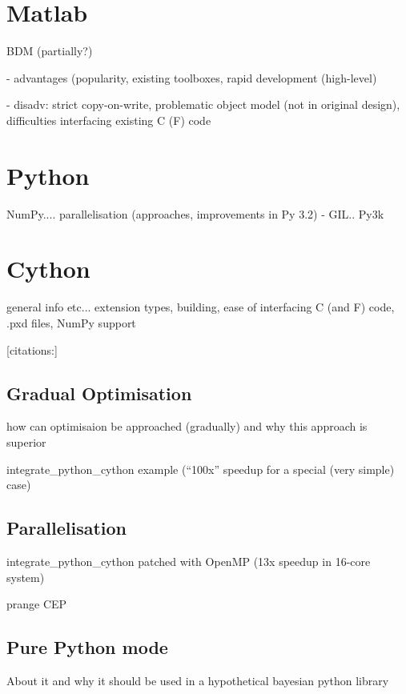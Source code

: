 \documentclass[a4paper,12pt,oneside]{report}
\begin{document}
\section{Matlab}

BDM (partially?)

 - advantages (popularity, existing toolboxes, rapid development (high-level)

 - disadv: strict copy-on-write, problematic object model (not in original design), difficulties
           interfacing existing C (F) code

\section{Python}

NumPy.... parallelisation (approaches, improvements in Py 3.2) - GIL.. Py3k

\section{Cython}

general info etc... extension types, building, ease of interfacing C (and F) code, .pxd files,
NumPy support

[citations:\cite{BehBraSel:09,Sel:09,BehBraCitDalSelSmi:11}]

\subsection{Gradual Optimisation}

how can optimisaion be approached (gradually) and why this approach is superior

integrate\_python\_cython example (``100x'' speedup for a special (very simple) case)

\subsection{Parallelisation}

integrate\_python\_cython patched with OpenMP (13x speedup in 16-core system)

prange CEP

\subsection{Pure Python mode}

About it and why it should be used in a hypothetical bayesian python library
\end{document}
